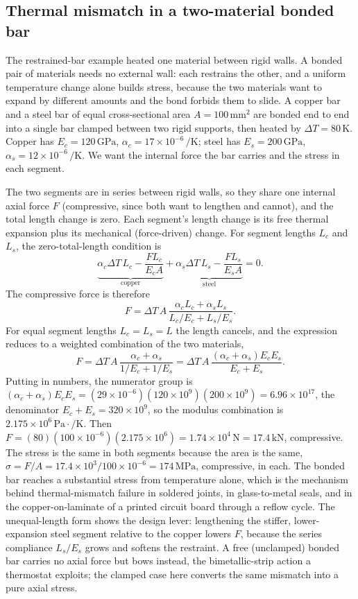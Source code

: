 

\subsection{Thermal mismatch in a two-material bonded bar}

The restrained-bar example heated one material between rigid walls. A
bonded pair of materials needs no external wall: each restrains the
other, and a uniform temperature change alone builds stress, because the
two materials want to expand by different amounts and the bond forbids
them to slide. A copper bar and a steel bar of equal cross-sectional
area $A = 100\,\si{\milli\meter}^2$ are bonded end to end into a single
bar clamped between two rigid supports, then heated by $\Delta T =
80\,\text{K}$. Copper has $E_c = 120\,\text{GPa}$, $\alpha_c = 17\times
10^{-6}\,\si{\per\kelvin}$; steel has $E_s = 200\,\text{GPa}$, $\alpha_s
= 12\times 10^{-6}\,\si{\per\kelvin}$. We want the internal force the bar
carries and the stress in each segment.

The two segments are in series between rigid walls, so they share one
internal axial force $F$ (compressive, since both want to lengthen and
cannot), and the total length change is zero. Each segment's length
change is its free thermal expansion plus its mechanical (force-driven)
change. For segment lengths $L_c$ and $L_s$, the zero-total-length
condition is
\[
\underbrace{\alpha_c \Delta T\,L_c - \frac{F L_c}{E_c A}}_{\text{copper}}
+ \underbrace{\alpha_s \Delta T\,L_s - \frac{F L_s}{E_s A}}_{\text{steel}}
= 0.
\]
The compressive force is therefore
\[
F = \Delta T\,A\,\frac{\alpha_c L_c + \alpha_s L_s}{L_c/E_c + L_s/E_s}.
\]
For equal segment lengths $L_c = L_s = L$ the length cancels, and the
expression reduces to a weighted combination of the two materials,
\[
F = \Delta T\,A\,\frac{\alpha_c + \alpha_s}{1/E_c + 1/E_s} = \Delta T\,A
\,\frac{(\alpha_c + \alpha_s)E_c E_s}{E_c + E_s}.
\]
Putting in numbers, the numerator group is $(\alpha_c + \alpha_s)E_c E_s
= (29\times 10^{-6})(120\times 10^9)(200\times 10^9) = 6.96\times
10^{17}$, the denominator $E_c + E_s = 320\times 10^9$, so the modulus
combination is $2.175\times 10^6\,\text{Pa}\cdot\si{\per\kelvin}$. Then
$F = (80)(100\times 10^{-6})(2.175\times 10^6) = 1.74\times 10^4\,\text
{N} = 17.4\,\text{kN}$, compressive. The stress is the same in both
segments because the area is the same, $\sigma = F/A = 17.4\times 10^3 /
100\times 10^{-6} = 174\,\text{MPa}$, compressive, in each. The bonded
bar reaches a substantial stress from temperature alone, which is the
mechanism behind thermal-mismatch failure in soldered joints, in
glass-to-metal seals, and in the copper-on-laminate of a printed circuit
board through a reflow cycle. The unequal-length form shows the design
lever: lengthening the stiffer, lower-expansion steel segment relative
to the copper lowers $F$, because the series compliance $L_s/E_s$ grows
and softens the restraint. A free (unclamped) bonded bar carries no
axial force but bows instead, the bimetallic-strip action a thermostat
exploits; the clamped case here converts the same mismatch into a pure
axial stress.

